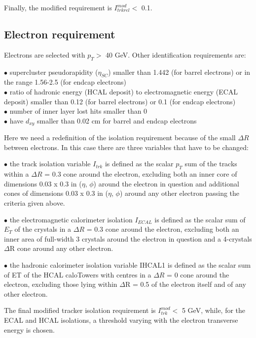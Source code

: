 \documentclass[12pt]{article} %
\begin{document}
Finally, the modified requirement is $I^{mod}_{trkrel} <$ 0.1.


\subsection{Electron requirement} %

Electrons are selected with $p_T >$ 40 GeV. Other identification requirements are:

\noindent
$\bullet$ supercluster pseudorapidity ($\eta _{SC}$) smaller than 1.442 (for barrel electrons) or in the range 1.56-2.5 (for endcap electrons) \\
$\bullet$ ratio of hadronic energy (HCAL deposit) to electromagnetic energy (ECAL deposit) smaller than 0.12 (for barrel electrons) or 0.1 (for endcap electrons) \\
$\bullet$ number of inner layer lost hits smaller than 0 \\
$\bullet$ have $d_{xy}$ smaller than 0.02 cm for barrel and endcap electrons

\noindent

Here we need a redefinition of the isolation requirement because of the small $\Delta R$ between electrons. In this case there are three variables that have to be changed:

\noindent
$\bullet$ the track isolation variable $I_{trk}$ is defined as the scalar $p_T$ sum of the tracks within a $\Delta R$ = 0.3 cone around the electron, excluding both an inner core of dimensions 0.03 x 0.3 in ($\eta$, $\phi$) around the electron in question and additional cones of dimensions 0.03 x 0.3 in ($\eta$, $\phi$) around any other electron passing the criteria given above. 

\noindent
$\bullet$ the electromagnetic calorimeter isolation $I_{ECAL}$ is defined as the scalar sum of $E_T$ of the crystals in a $\Delta R$ = 0.3 cone around the electron, excluding both an inner area of full-width 3 crystals around the electron in question and a 4-crystals $\Delta$R cone around any other electron.
 
\noindent
$\bullet$ the hadronic calorimeter isolation variable IHCAL1 is defined as the scalar sum of ET of the HCAL caloTowers with centres in a $\Delta R$ = 0 cone around the electron, excluding those lying within $\Delta$R = 0.5 of the electron itself and of any other electron.

The final modified tracker isolation requirement is $I^{mod}_{trk} <$ 5 GeV, while, for the ECAL and HCAL isolations, a threshold varying with the electron transverse energy is chosen.
\end{document}
